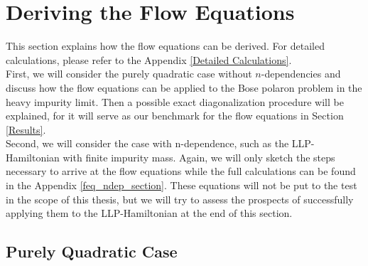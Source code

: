 \chapter{Deriving the Flow Equations}\label{Determining the Flow Equations}
This section explains how the flow equations can be derived. For detailed calculations, please refer to the Appendix \ref{Detailed Calculations}.\\
First, we will consider the purely quadratic case without $n$-dependencies and discuss how the flow equations can be applied to the Bose polaron problem in the heavy impurity limit. Then a possible exact diagonalization procedure will be explained, for it will serve as our benchmark for the flow equations in Section \ref{Results}.\\
Second, we will consider the case with n-dependence, such as the LLP-Hamiltonian with finite impurity mass. Again, we will only sketch the steps necessary to arrive at the flow equations while the full calculations can be found in the Appendix \ref{feq_ndep_section}. These equations will not be put to the test in the scope of this thesis, but we will try to assess the prospects of successfully applying them to the LLP-Hamiltonian at the end of this section.
\section{Purely Quadratic Case}
